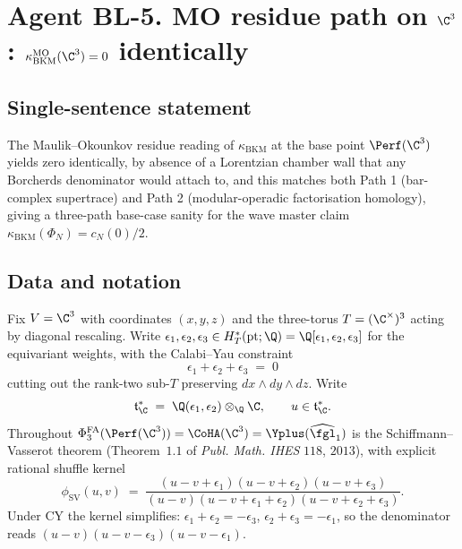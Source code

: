 
\section*{Agent BL-5.  MO residue path on $\C^3$: $\kappa_{\mathrm{BKM}}^{\mathrm{MO}}(\C^3) = 0$ identically}
\label{sec:bl-5-mo-c3-vanishing}

\subsection*{Single-sentence statement}

The Maulik--Okounkov residue reading of $\kappa_{\mathrm{BKM}}$ at
the base point $\Perf(\C^3)$ yields zero identically, by absence of a
Lorentzian chamber wall that any Borcherds denominator would attach
to, and this matches both Path 1 (bar-complex supertrace) and Path 2
(modular-operadic factorisation homology), giving a three-path
base-case sanity for the wave master claim
$\kappa_{\mathrm{BKM}}(\Phi_N) = c_N(0)/2$.

\subsection*{Data and notation}

Fix $V = \C^3$ with coordinates $(x, y, z)$ and the three-torus
$T = (\C^\times)^3$ acting by diagonal rescaling. Write
$\epsilon_1, \epsilon_2, \epsilon_3 \in H^*_T(\mathrm{pt}; \Q) =
\Q[\epsilon_1, \epsilon_2, \epsilon_3]$ for the equivariant weights,
with the Calabi--Yau constraint
\[
 \epsilon_1 + \epsilon_2 + \epsilon_3 \;=\; 0
\]
cutting out the rank-two sub-$T$ preserving
$dx \wedge dy \wedge dz$. Write
\[
 \mathfrak t^*_\C \;=\; \Q(\epsilon_1, \epsilon_2) \otimes_\Q \C,
 \qquad u \in \mathfrak t^*_\C.
\]
Throughout $\Phi^{\mathrm{FA}}_3(\Perf(\C^3)) = \CoHA(\C^3) =
\Yplus(\widehat{\fgl}_1)$ is the Schiffmann--Vasserot theorem
(Theorem~$1.1$ of \textit{Publ. Math. IHES} $118$, $2013$), with
explicit rational shuffle kernel
\[
 \phi_{\mathrm{SV}}(u, v)
 \;=\;
 \frac{(u - v + \epsilon_1)(u - v + \epsilon_2)(u - v + \epsilon_3)}
      {(u - v)(u - v + \epsilon_1 + \epsilon_2)(u - v + \epsilon_2 + \epsilon_3)}.
\]
Under CY the kernel simplifies: $\epsilon_1 + \epsilon_2 =
-\epsilon_3$, $\epsilon_2 + \epsilon_3 = -\epsilon_1$, so the
denominator reads $(u - v)(u - v - \epsilon_3)(u - v - \epsilon_1)$.


